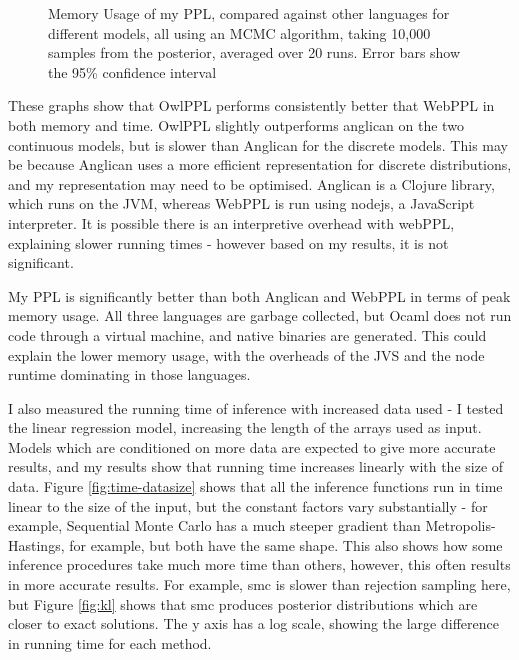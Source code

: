 \begin{figure}[!ht]
	\centering
	
	\caption{Memory Usage of my PPL, compared against other languages for different models, all using an MCMC algorithm, taking 10,000 samples from the posterior, averaged over 20 runs. Error bars show the 95\% confidence interval}
	\label{fig:mem-perf}
\end{figure}

These graphs show that OwlPPL performs consistently better that WebPPL in both memory and time. OwlPPL slightly outperforms anglican on the two continuous models, but is slower than Anglican for the discrete models. This may be because Anglican uses a more efficient representation for discrete distributions, and my representation may need to be optimised. Anglican is a Clojure library, which runs on the JVM, whereas WebPPL is run using nodejs, a JavaScript interpreter. It is possible there is an interpretive overhead with webPPL, explaining slower running times - however based on my results, it is not significant. 

My PPL is significantly better than both Anglican and WebPPL in terms of peak memory usage. All three languages are garbage collected, but Ocaml does not run code through a virtual machine, and native binaries are generated. This could explain the lower memory usage, with the overheads of the JVS and the node runtime dominating in those languages.


I also measured the running time of inference with increased data used - I tested the linear regression model, increasing the length of the arrays used as input. Models which are conditioned on more data are expected to give more accurate results, and my results show that running time increases linearly with the size of data. Figure \ref{fig:time-datasize} shows that all the inference functions run in time linear to the size of the input, but the constant factors vary substantially - for example, Sequential Monte Carlo has a much steeper gradient than Metropolis-Hastings, for example, but both have the same shape. This also shows how some inference procedures take much more time than others, however, this often results in more accurate results. For example, smc is slower than rejection sampling here, but Figure \ref{fig:kl} shows that smc produces posterior distributions which are closer to exact solutions. The y axis has a log scale, showing the large difference in running time for each method.

